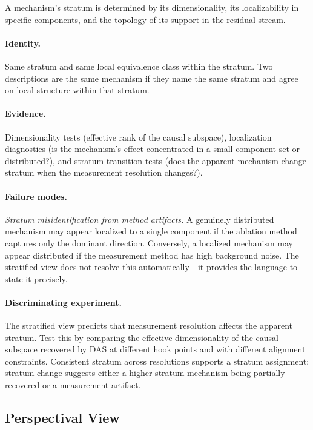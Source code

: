 \documentclass{article}
\begin{document}
A mechanism's stratum is determined
by its dimensionality, its localizability in specific components, and
the topology of its support in the residual stream.

\paragraph{Identity.}
Same stratum and same local equivalence class within the stratum.  Two
descriptions are the same mechanism if they name the same stratum and
agree on local structure within that stratum.

\paragraph{Evidence.}
Dimensionality tests (effective rank of the causal subspace),
localization diagnostics (is the mechanism's effect concentrated in a
small component set or distributed?), and stratum-transition tests
(does the apparent mechanism change stratum when the measurement
resolution changes?).

\paragraph{Failure modes.}
\emph{Stratum misidentification from method artifacts.}  A genuinely
distributed mechanism may appear localized to a single component if
the ablation method captures only the dominant direction.  Conversely,
a localized mechanism may appear distributed if the measurement method
has high background noise.  The stratified view does not resolve this
automatically---it provides the language to state it precisely.

\paragraph{Discriminating experiment.}
The stratified view predicts that measurement resolution affects the
apparent stratum.  Test this by comparing the effective dimensionality
of the causal subspace recovered by DAS at different hook points and
with different alignment constraints.  Consistent stratum across
resolutions supports a stratum assignment; stratum-change suggests
either a higher-stratum mechanism being partially recovered or a
measurement artifact.

\subsection{Perspectival View}
\end{document}
